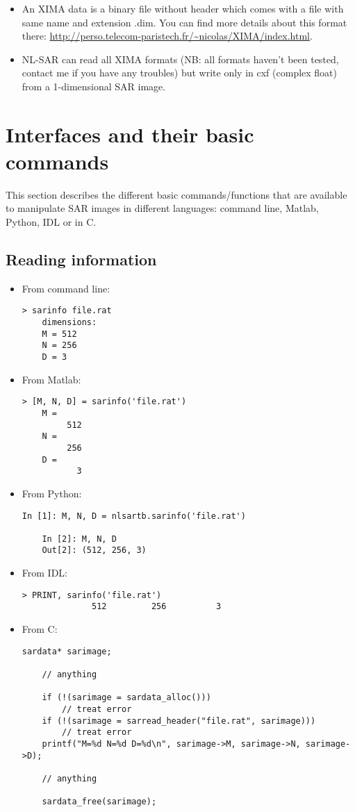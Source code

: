 \documentclass[10pt,french,english,a4paper]{article}
\begin{document}
\begin{itemize}
\item
  An XIMA data is a binary file without header which comes with a file with same name and extension .dim.
  You can find more details about this format there: \url{http://perso.telecom-paristech.fr/~nicolas/XIMA/index.html}.
\item
  NL-SAR can read all XIMA formats (NB: all formats haven't been tested,
  contact me if you have any troubles)
  but write only in cxf (complex float) from a
  1-dimensional SAR image.
\end{itemize}

\section{Interfaces and their basic commands}

This section describes the different basic commands/functions that are available
to manipulate SAR images in different languages: command line,
Matlab, Python, IDL or in C.

\subsection{Reading information}

\begin{itemize}
\item From command line:
  \begin{Verbatim}[frame=single]
    > sarinfo file.rat
    dimensions:
	M = 512
	N = 256
	D = 3
  \end{Verbatim}
\item From Matlab:
  \begin{Verbatim}[frame=single]
    > [M, N, D] = sarinfo('file.rat')
    M =
         512
    N =
         256
    D =
           3
  \end{Verbatim}
\item From Python:
  \begin{Verbatim}[frame=single]
    In [1]: M, N, D = nlsartb.sarinfo('file.rat')

    In [2]: M, N, D
    Out[2]: (512, 256, 3)
  \end{Verbatim}
\item From IDL:
  \begin{Verbatim}[frame=single]
    > PRINT, sarinfo('file.rat')
              512         256          3
  \end{Verbatim}
\item From C:
  \begin{Verbatim}[frame=single]
    sardata* sarimage;

    // anything

    if (!(sarimage = sardata_alloc()))
        // treat error
    if (!(sarimage = sarread_header("file.rat", sarimage)))
        // treat error
    printf("M=%d N=%d D=%d\n", sarimage->M, sarimage->N, sarimage->D);

    // anything

    sardata_free(sarimage);
  \end{Verbatim}
\end{itemize}
\end{document}
